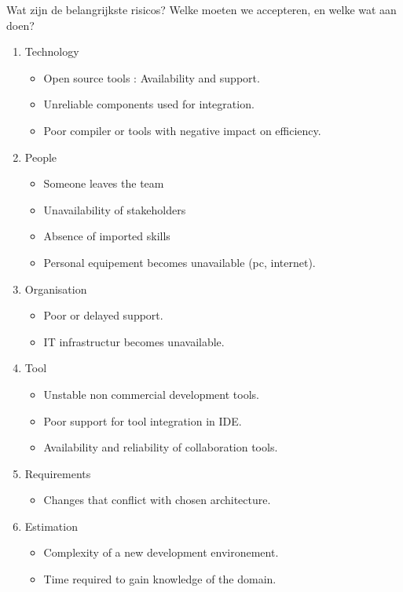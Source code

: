 \documentclass[a4paper,11pt,twoside,draft]{article}
\begin{document}
Wat zijn de belangrijkste risicos? Welke moeten we accepteren, en welke wat aan doen?
\begin{enumerate}
	\item Technology
	\begin{itemize}
		\item Open source tools : Availability and support.
		\item Unreliable components used for integration.
		\item Poor compiler or tools with negative impact on efficiency.
	\end{itemize}
	\item People
	\begin{itemize}
		\item Someone leaves the team
		\item Unavailability of stakeholders
		\item Absence of imported skills
		\item Personal equipement becomes unavailable (pc, internet).
	\end{itemize}
	\item Organisation
	\begin{itemize}
		\item Poor or delayed support.
		\item IT infrastructur becomes unavailable.
	\end{itemize}
	\item Tool
	\begin{itemize}
		\item Unstable non commercial development tools.
		\item Poor support for tool integration in IDE.
		\item Availability and reliability of collaboration tools. 
	\end{itemize}
	\item Requirements
	\begin{itemize}
		\item Changes that conflict with chosen architecture.
	\end{itemize}
	\item Estimation
	\begin{itemize}
		\item Complexity of a new development environement. 
		\item Time required to gain knowledge of the domain.
	\end{itemize}
\end{enumerate}
\end{document}

